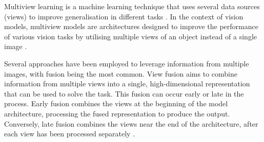 Multiview learning is a machine learning technique that uses several data sources (views) to improve generalisation in different tasks \cite{multiview_a_surview}. In the context of vision models, multiview models are architectures designed to improve the performance of various vision tasks by utilising multiple views of an object instead of a single image \cite{multiview_hybrid_fusion_mutual_distill}.

Several approaches have been employed to leverage information from multiple images, with fusion being the most common. View fusion aims to combine information from multiple views into a single, high-dimensional representation that can be used to solve the task. This fusion can occur early or late in the process. Early fusion combines the views at the beginning of the model architecture, processing the fused representation to produce the output. Conversely, late fusion combines the views near the end of the architecture, after each view has been processed separately \cite{multiview_a_surview, multiview_hybrid_fusion_mutual_distill}.